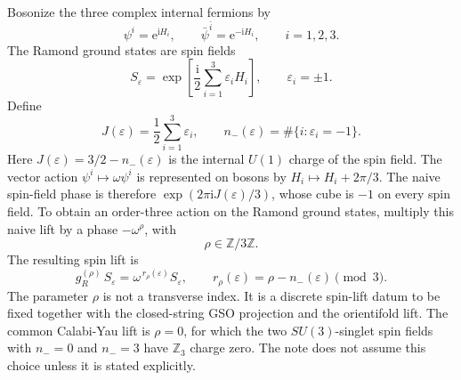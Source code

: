 \documentclass[11pt]{article}
\newcommand{\Z}{\mathbb{Z}}
\newcommand{\ii}{\mathrm{i}}
\newcommand{\e}{\mathrm{e}}
\begin{document}
Bosonize the three complex internal fermions by
\begin{equation}
  \psi^i=\e^{\ii H_i},
  \qquad
  \bar\psi^{\bar i}=\e^{-\ii H_i},
  \qquad
  i=1,2,3.
  \label{eq:fermion-bosonization}
\end{equation}
The Ramond ground states are spin fields
\begin{equation}
  S_{\varepsilon}
  =
  \exp\left[
    \frac{\ii}{2}\sum_{i=1}^3 \varepsilon_i H_i
  \right],
  \qquad
  \varepsilon_i=\pm 1.
  \label{eq:internal-spin-fields}
\end{equation}
Define
\begin{equation}
  J(\varepsilon)=\frac12\sum_{i=1}^3\varepsilon_i,
  \qquad
  n_-(\varepsilon)=\#\{i:\varepsilon_i=-1\}.
  \label{eq:spin-field-J-and-nminus}
\end{equation}
Here \(J(\varepsilon)=3/2-n_-(\varepsilon)\) is the internal \(U(1)\) charge of the spin field.
The vector action \(\psi^i\mapsto\omega\psi^i\) is represented on bosons by
\(H_i\mapsto H_i+2\pi/3\). The naive spin-field phase is therefore
\(\exp(2\pi\ii J(\varepsilon)/3)\), whose cube is \(-1\) on every spin field. To obtain an
order-three action on the Ramond ground states, multiply this naive lift by a phase
\(-\omega^\rho\), with
\begin{equation}
  \rho\in\Z/3\Z.
  \label{eq:spin-lift-rho}
\end{equation}
The resulting spin lift is
\begin{equation}
  g_R^{(\rho)}\,S_{\varepsilon}
  =
  \omega^{\,r_\rho(\varepsilon)}S_{\varepsilon},
  \qquad
  r_\rho(\varepsilon)=\rho-n_-(\varepsilon)\pmod 3.
  \label{eq:R-spin-lift-action}
\end{equation}
The parameter \(\rho\) is not a transverse index. It is a discrete spin-lift datum to be fixed
together with the closed-string GSO projection and the orientifold lift. The common
Calabi-Yau lift is \(\rho=0\), for which the two \(SU(3)\)-singlet spin fields with
\(n_-=0\) and \(n_-=3\) have \(\Z_3\) charge zero. The note does not assume this choice unless
it is stated explicitly.
\end{document}
